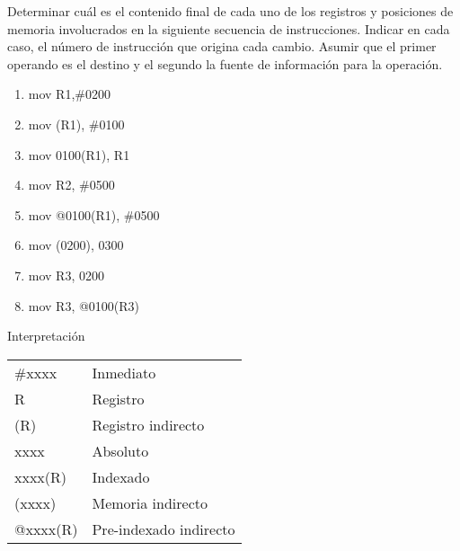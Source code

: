 \documentclass[12pt,a4paper]{article}
\begin{document}
 \newpage

 Determinar cuál es el contenido final de cada uno de los registros y posiciones de memoria involucrados en la siguiente secuencia de instrucciones. Indicar en cada caso, el número de instrucción que origina cada cambio. Asumir que el primer operando es el destino y el segundo la fuente de información para la operación.
\begin{center}
	\begin{minipage}{0.4\textwidth}
		\begin{enumerate}[(1)]
			\itemsep -5pt
			\item mov R1,\#0200
			\item mov (R1), \#0100
			\item mov 0100(R1), R1
			\item mov R2, \#0500
			\item mov @0100(R1), \#0500
			\item mov (0200), 0300
			\item mov R3, 0200
			\item mov R3, @0100(R3)
		\end{enumerate}
	\end{minipage}
	\begin{minipage}{0.4\textwidth}
		Interpretación
		\begin{tabular}{ll}
			\#xxxx   & Inmediato\\
			R       & Registro \\
			(R)     & Registro indirecto\\
			xxxx    & Absoluto \\
			xxxx(R) & Indexado \\
			(xxxx)  & Memoria indirecto\\
			@xxxx(R) & Pre-indexado indirecto
		\end{tabular}
	\end{minipage}
\end{center}
\end{document}
